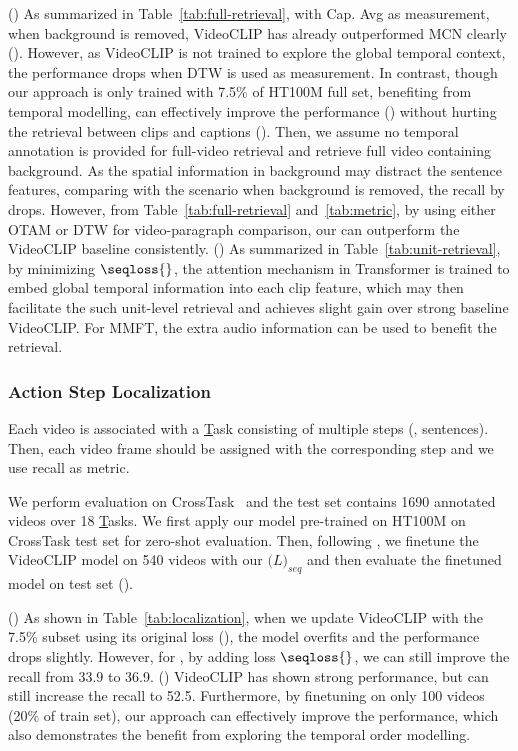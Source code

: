 () 
As summarized in Table~\ref{tab:full-retrieval}, with Cap. Avg as measurement, when background is removed, VideoCLIP has already outperformed MCN clearly (). However, as VideoCLIP is not trained to explore the global temporal context, the performance drops when DTW is used as measurement.
In contrast, though our approach is only trained with 7.5\% of HT100M full set, benefiting from temporal modelling, \approach{} can effectively improve the performance () without hurting the retrieval between clips and captions ().
Then, we assume no temporal annotation is provided for full-video retrieval and retrieve full video containing background.
As the spatial information in background may distract the sentence features, comparing with the scenario when background is removed, the recall by \approach{} drops. 
However, from Table~\ref{tab:full-retrieval} and~\ref{tab:metric}, by using either OTAM or DTW for video-paragraph comparison, our \approach{} can outperform the VideoCLIP baseline consistently.  
() As summarized in Table~\ref{tab:unit-retrieval}, by minimizing $\seqloss{}$, the attention mechanism in Transformer is trained to embed global temporal information into each clip feature, which may then facilitate the such unit-level retrieval and achieves slight gain over strong baseline VideoCLIP. For MMFT, the extra audio information can be used to benefit the retrieval.



\subsubsection{Action Step Localization}

 Each video is associated with a \underline{T}ask consisting of multiple steps (\ie, sentences). 
Then, each video frame should be assigned with the corresponding step and we use recall as metric. 

 We perform evaluation on CrossTask~\citep{zhukov2019cross} and the test set contains 1690 annotated videos over 18 \underline{T}asks.
We first apply our model pre-trained on HT100M on CrossTask test set for zero-shot evaluation.
Then, following \citet{xu2021videoclip}, we finetune the VideoCLIP model on 540 videos with our $\mathcal(L)_{seq}$ and then evaluate the finetuned model on test set ().

 () As shown in Table~\ref{tab:localization}, when we update VideoCLIP with the 7.5\% subset using its original loss (), the model overfits and the performance drops slightly. However, for \approach{}, by adding loss $\seqloss{}$, we can still improve the recall from 33.9 to 36.9.
() VideoCLIP has shown strong performance, but \approach{} can still increase the recall to 52.5.
Furthermore, by finetuning on only 100 videos (20\% of train set), our approach can effectively improve the performance, which also demonstrates the benefit from exploring the temporal order modelling.

